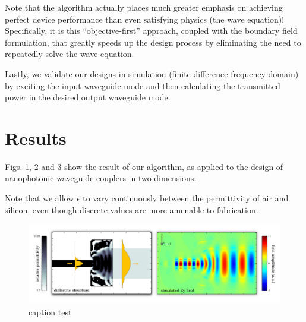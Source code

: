 \documentclass[letterpaper,10pt]{article}
\begin{document}
Note that the algorithm actually places much greater emphasis on achieving 
perfect device performance than even satisfying physics (the wave equation)!
Specifically, it is this ``objective-first'' approach, 
coupled with the boundary field formulation, 
that greatly speeds up the design process by eliminating the need to  
repeatedly solve the wave equation.

Lastly, we validate our designs in simulation (finite-difference 
frequency-domain) by exciting the input waveguide mode and then calculating
the transmitted power in the desired output waveguide mode.

\section{Results}
Figs. 1, 2 and 3 show the result of our algorithm, as applied to the design 
of nanophotonic waveguide couplers in two dimensions.  

Note that we allow $\epsilon$ to vary continuously between the
permittivity of air and silicon, even though discrete values are more
amenable to fabrication.
\begin{figure}[htbp]
    \includegraphics[width=\textwidth]{fig/fiber.jpg}
    \caption{caption test}
\end{figure}
\end{document}
